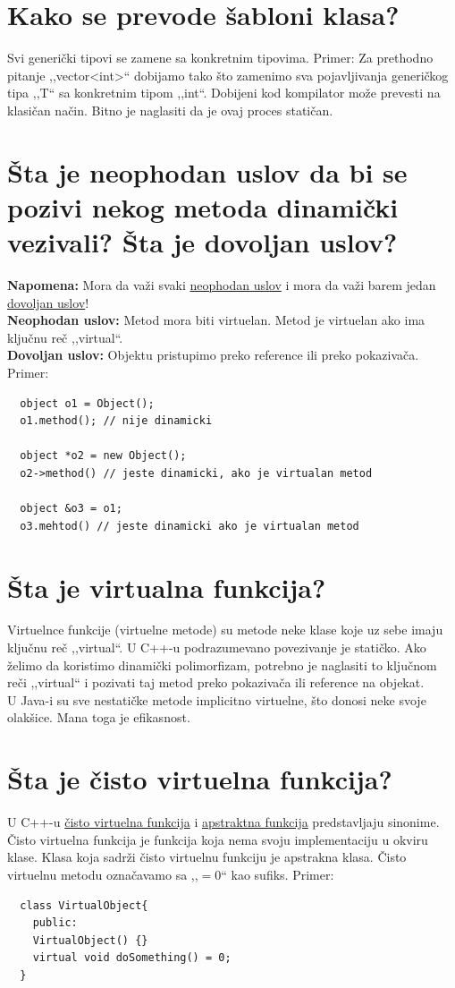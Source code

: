 \documentclass[a4paper]{article}
\begin{document}
\section{Kako se prevode šabloni klasa?}
  Svi generički tipovi se zamene sa konkretnim tipovima.
  Primer: Za prethodno pitanje ,,vector<int>`` dobijamo tako što zamenimo sva pojavljivanja generičkog 
  tipa ,,T`` sa konkretnim tipom ,,int``. Dobijeni kod kompilator može prevesti na klasičan način. 
  Bitno je naglasiti da je ovaj proces statičan.

\section{Šta je neophodan uslov da bi se pozivi nekog metoda dinamički vezivali? Šta je dovoljan uslov?}
  \textbf{Napomena:} Mora da važi svaki \underline{neophodan uslov} i 
  mora da važi barem jedan \underline{dovoljan uslov}!\\
  \textbf{Neophodan uslov:} Metod mora biti virtuelan. Metod je virtuelan ako ima ključnu reč ,,virtual``.\\
  \textbf{Dovoljan uslov:} Objektu pristupimo preko reference ili preko pokazivača.
  Primer:
  \begin{lstlisting}
  object o1 = Object();
  o1.method(); // nije dinamicki

  object *o2 = new Object();
  o2->method() // jeste dinamicki, ako je virtualan metod

  object &o3 = o1;
  o3.mehtod() // jeste dinamicki ako je virtualan metod\end{lstlisting}
\section{Šta je virtualna funkcija?}
  Virtuelnce funkcije (virtuelne metode) su metode neke klase koje uz sebe imaju ključnu reč ,,virtual``.
  U C++-u podrazumevano povezivanje je statičko. Ako želimo da koristimo dinamički polimorfizam, potrebno je
  naglasiti to ključnom reči ,,virtual`` i pozivati taj metod preko pokazivača ili reference na objekat.\\
  \indent U Java-i su sve nestatičke metode implicitno virtuelne, što donosi neke svoje olakšice. Mana 
  toga je efikasnost.

\section{Šta je čisto virtuelna funkcija?}
  U C++-u \underline{čisto virtuelna funkcija} i \underline{apstraktna funkcija} predstavljaju 
  sinonime. Čisto virtuelna funkcija
  je funkcija koja nema svoju implementaciju u okviru klase. Klasa koja sadrži čisto virtuelnu funkciju
  je apstrakna klasa. Čisto virtuelnu metodu označavamo sa ,,$= 0$`` kao sufiks.
  Primer:
  \begin{lstlisting}
  class VirtualObject{
    public:
    VirtualObject() {}
    virtual void doSomething() = 0;
  }\end{lstlisting}
\end{document}
